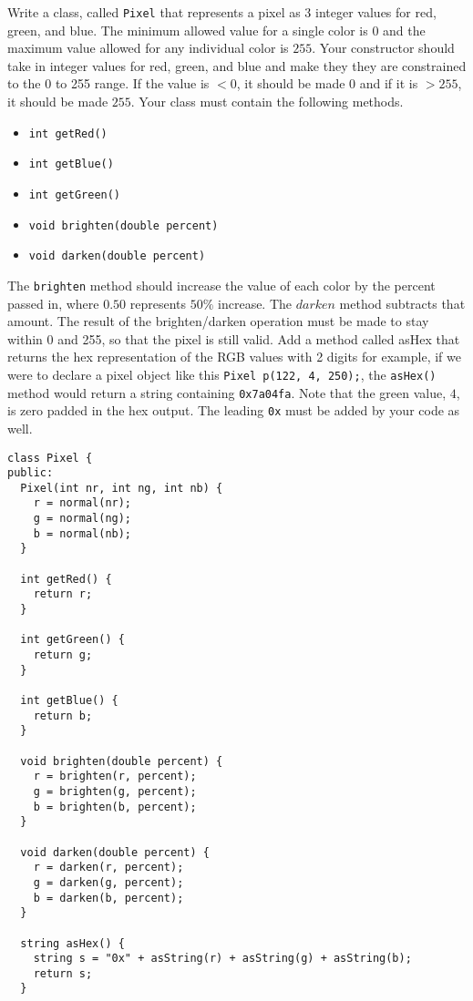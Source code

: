 \documentclass[11pt,answers]{exam}
\begin{document}
\begin{questions}
\newpage
\question[30] Write a class, called {\tt Pixel} that represents a pixel as 3 integer values for red, green, and blue. The minimum allowed value for a single color is $0$ and the maximum value allowed for any individual color is $255$. Your constructor should take in integer values for red, green, and blue and make they they are constrained to the 0 to 255 range. If the value is $< 0$, it should be made $0$ and if it is $> 255$, it should be made $255$. Your class must contain the following methods.
\begin{itemize}
  \item {\tt int getRed()}
  \item {\tt int getBlue()}
  \item {\tt int getGreen()}
  \item {\tt void brighten(double percent)}
  \item {\tt void darken(double percent)}
\end{itemize}
The {\tt brighten} method should increase the value of each color by the percent passed in, where $0.50$ represents $50\%$ increase. The $darken$ method subtracts that amount. The result of the brighten/darken operation must be made to stay within 0 and 255, so that the pixel is still valid.
\bonusquestion[15] Add a method called asHex that returns the hex representation of the RGB values with 2 digits for example, if we were to declare a pixel object like this {\tt Pixel p(122, 4, 250);}, the {\tt asHex()} method would return a string containing {\tt 0x7a04fa}. Note that the green value, $4$, is zero padded in the hex output. The leading {\tt 0x} must be added by your code as well.

\begin{solution}
\begin{lstlisting}
class Pixel {
public:
  Pixel(int nr, int ng, int nb) {
    r = normal(nr);
    g = normal(ng);
    b = normal(nb);
  }
  
  int getRed() {
    return r;
  }
  
  int getGreen() {
    return g;
  }
  
  int getBlue() {
    return b;
  }
  
  void brighten(double percent) {
    r = brighten(r, percent);
    g = brighten(g, percent);
    b = brighten(b, percent);
  }
  
  void darken(double percent) {
    r = darken(r, percent);
    g = darken(g, percent);
    b = darken(b, percent);
  }

  string asHex() {
    string s = "0x" + asString(r) + asString(g) + asString(b);
    return s;
  }


\end{lstlisting}
\end{solution}
\end{questions}
\end{document}
